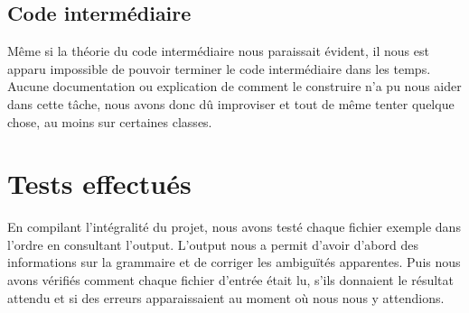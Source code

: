 \documentclass{article}
\begin{document}
\subsection{Code intermédiaire}

Même si la théorie du code intermédiaire nous paraissait évident, il nous est apparu impossible de pouvoir terminer le code intermédiaire dans les temps. Aucune documentation ou explication de comment le construire n'a pu nous aider dans cette tâche, nous avons donc dû improviser et tout de même tenter quelque chose, au moins sur certaines classes.

\section{Tests effectués}

En compilant l'intégralité du projet, nous avons testé chaque fichier exemple dans l'ordre en consultant l'output. L'output nous a permit d'avoir d'abord des informations sur la grammaire et de corriger les ambiguïtés apparentes. Puis nous avons vérifiés comment chaque fichier d'entrée était lu, s'ils donnaient le résultat attendu et si des erreurs apparaissaient au moment où nous nous y attendions.
\end{document}
